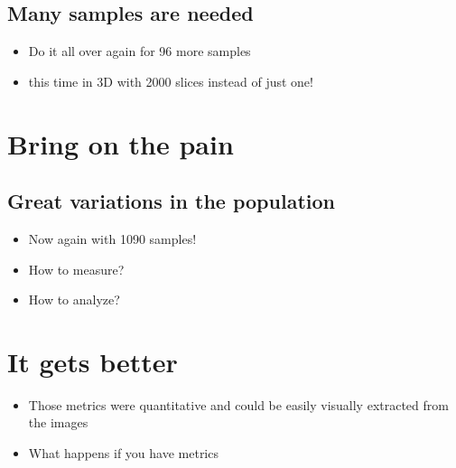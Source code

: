 \documentclass[letterpaper,10pt,english]{sphinxmanual}
\begin{document}
\subsection{Many samples are needed}
\label{\detokenize{01-Introduction:many-samples-are-needed}}\begin{itemize}
\item {} 
\sphinxAtStartPar
Do it all over again for 96 more samples

\item {} 
\sphinxAtStartPar
this time in 3D with 2000 slices instead of just one!

\end{itemize}



\sphinxAtStartPar
{}




\section{Bring on the pain}
\label{\detokenize{01-Introduction:bring-on-the-pain}}



\subsection{Great variations in the population}
\label{\detokenize{01-Introduction:great-variations-in-the-population}}\begin{itemize}
\item {} 
\sphinxAtStartPar
Now again with 1090 samples!

\item {} 
\sphinxAtStartPar
How to measure?

\item {} 
\sphinxAtStartPar
How to analyze?

\end{itemize}



\sphinxAtStartPar
{}




\section{It gets better}
\label{\detokenize{01-Introduction:it-gets-better}}\begin{itemize}
\item {} 
\sphinxAtStartPar
Those metrics were quantitative and could be easily visually extracted from the images

\item {} 
\sphinxAtStartPar
What happens if you have  metrics

\end{itemize}
\end{document}
